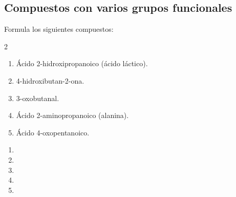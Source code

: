 \subsection*{Compuestos con varios grupos funcionales}

\begin{exercise}
    Formula los siguientes compuestos:
    \begin{multicols}{2}
        \begin{enumerate}[label=\alph*)]
            \item Ácido 2-hidroxipropanoico (ácido láctico).
            \item 4-hidroxibutan-2-ona.
            \item 3-oxobutanal.
            \item Ácido 2-aminopropanoico (alanina).
            \item Ácido 4-oxopentanoico.
        \end{enumerate}
    \end{multicols}
    \begin{solu}
        \begin{enumerate}[label=\alph*)]
            \item {}
            \item {}
            \item {}
            \item {}
            \item {}
        \end{enumerate}
    \end{solu}
\end{exercise}

